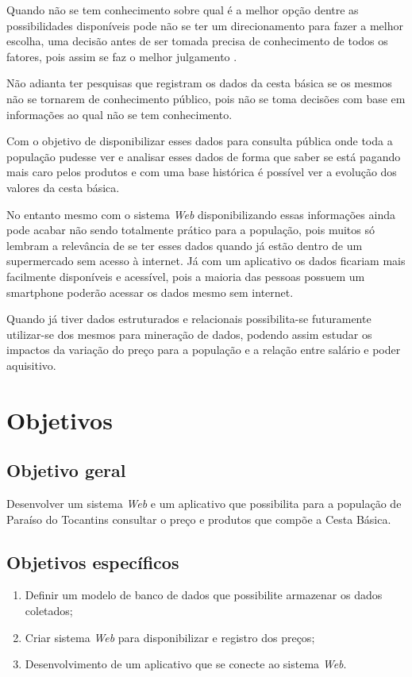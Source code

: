 \documentclass{ifto-tex}
\begin{document}
		Quando não se tem conhecimento sobre qual é a melhor opção dentre as possibilidades disponíveis pode não se ter um direcionamento para fazer a melhor escolha, uma decisão antes de ser tomada precisa de conhecimento de todos os fatores, pois assim se faz o melhor julgamento \cite{bezerra2013efeito}.

Não adianta ter pesquisas que registram os dados da cesta básica se os mesmos não se tornarem de conhecimento público, pois não se toma decisões com base em informações ao qual não se tem conhecimento.

Com o objetivo de disponibilizar esses dados para consulta pública onde toda a população pudesse ver e analisar esses dados de forma que saber se está pagando mais caro pelos produtos e com uma base histórica é possível ver a evolução dos valores da cesta básica.

No entanto mesmo com o sistema \textit{Web} disponibilizando essas informações ainda pode acabar não sendo totalmente prático para a população, pois muitos só lembram a relevância de se ter esses dados quando já estão dentro de um supermercado sem acesso à  internet. Já com um aplicativo os dados ficariam mais facilmente disponíveis e acessível, pois a maioria das pessoas possuem um smartphone poderão acessar os dados mesmo sem internet.

Quando já tiver dados estruturados e relacionais possibilita-se futuramente utilizar-se dos mesmos para mineração de dados, podendo assim estudar os impactos da variação do preço para a população e a relação entre salário e poder aquisitivo.
	
	\section{Objetivos}
	
		\subsection{Objetivo geral}
		
			Desenvolver um sistema \textit{Web} e um aplicativo que possibilita para a população de Paraíso do Tocantins consultar o preço e produtos que compõe a Cesta Básica.
		
		\subsection{Objetivos específicos}
		
			\begin{enumerate}
						\item Definir um modelo de banco de dados que possibilite armazenar os dados coletados;
			\item Criar sistema \textit{Web} para disponibilizar e registro dos preços;
			\item Desenvolvimento de um aplicativo que se conecte ao sistema \textit{Web}.
			\end{enumerate}
\end{document}
